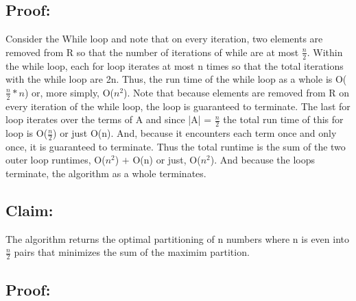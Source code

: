 \documentclass[11pt]{article}
\begin{document}
\subsection*{Proof:}
Consider the While loop and note that on every iteration, two elements are removed from R so that the number of iterations of while are at most $\frac{n}{2}$. Within the while loop, each for loop iterates at most n times so that the total iterations with the while loop are 2n. Thus, the run time of the while loop as a whole is O($\frac{n}{2} * n$) or, more simply, O($n^2$). Note that because elements are removed from R on every iteration of the while loop, the loop is guaranteed to terminate. The last for loop iterates over the terms of A and since |A| = $\frac{n}{2}$ the total run time of this for loop is O($\frac{n}{2}$) or just O(n). And, because it encounters each term once and only once, it is guaranteed to terminate. Thus the total runtime is the sum of the two outer loop runtimes, O($n^2$) $+$ O(n) or just, O($n^2$). And because the loops terminate, the algorithm as a whole terminates.

\subsection*{Claim:} 
The algorithm returns the optimal partitioning of n numbers where n is even into $\frac{n}{2}$ pairs that minimizes the sum of the maximim partition.

\subsection*{Proof:}
\end{document}
